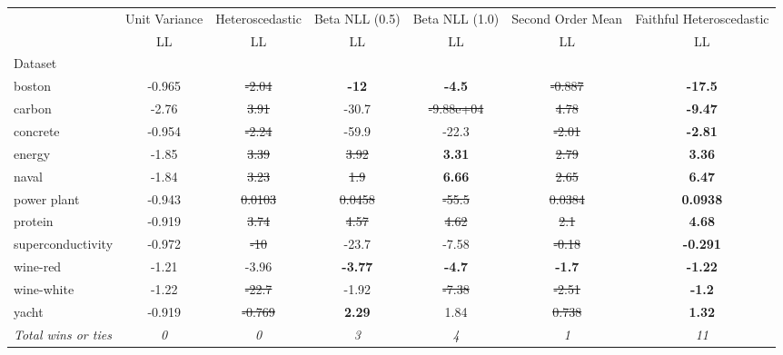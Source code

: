 \begin{tabular}{l|c|c|c|c|c|c}
\toprule
{} & {Unit Variance} & {Heteroscedastic} & {Beta NLL (0.5)} & {Beta NLL (1.0)} & {Second Order Mean} & {Faithful Heteroscedastic} \\
{} & {LL} & {LL} & {LL} & {LL} & {LL} & {LL} \\
{Dataset} & {} & {} & {} & {} & {} & {} \\
\midrule
boston & -0.965 & \sout{-2.04} & \textbf{-12} & \textbf{-4.5} & \sout{-0.887} & \textbf{-17.5} \\
carbon & -2.76 & \sout{3.91} & -30.7 & \sout{-9.88e+04} & \sout{4.78} & \textbf{-9.47} \\
concrete & -0.954 & \sout{-2.24} & -59.9 & -22.3 & \sout{-2.01} & \textbf{-2.81} \\
energy & -1.85 & \sout{3.39} & \sout{3.92} & \textbf{3.31} & \sout{2.79} & \textbf{3.36} \\
naval & -1.84 & \sout{3.23} & \sout{1.9} & \textbf{6.66} & \sout{2.65} & \textbf{6.47} \\
power plant & -0.943 & \sout{0.0103} & \sout{0.0458} & \sout{-55.5} & \sout{0.0384} & \textbf{0.0938} \\
protein & -0.919 & \sout{3.74} & \sout{4.57} & \sout{4.62} & \sout{2.1} & \textbf{4.68} \\
superconductivity & -0.972 & \sout{-10} & -23.7 & -7.58 & \sout{-0.18} & \textbf{-0.291} \\
wine-red & -1.21 & -3.96 & \textbf{-3.77} & \textbf{-4.7} & \textbf{-1.7} & \textbf{-1.22} \\
wine-white & -1.22 & \sout{-22.7} & -1.92 & \sout{-7.38} & \sout{-2.51} & \textbf{-1.2} \\
yacht & -0.919 & \sout{-0.769} & \textbf{2.29} & 1.84 & \sout{0.738} & \textbf{1.32} \\
\textit{{Total wins or ties}} & \textit{0} & \textit{0} & \textit{3} & \textit{4} & \textit{1} & \textit{11} \\
\bottomrule
\end{tabular}
